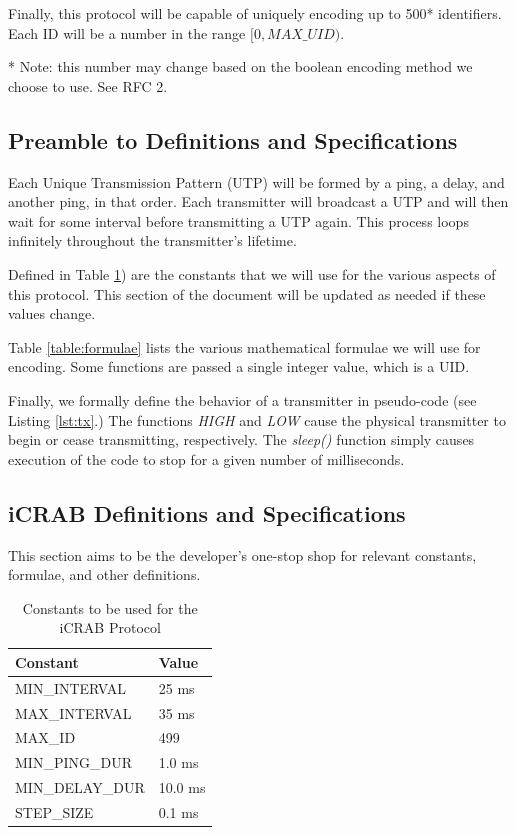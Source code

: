 \documentclass[12pt]{article}
\begin{document}
Finally, this protocol will be capable of uniquely encoding up to 500*
identifiers.
Each ID will be a number in the range $[0, MAX\_UID)$.

* Note: this number may change based on the boolean encoding method we choose
to use. See RFC 2.

\subsection{Preamble to Definitions and Specifications} \label{preamble}

Each Unique Transmission Pattern (UTP) will be formed by a ping, a delay,
and another ping, in that order.
Each transmitter will broadcast a UTP and will then wait for some interval
before transmitting a UTP again.
This process loops infinitely throughout the transmitter's lifetime.

Defined in Table \ref{table:constants}) are the constants that we will use for
the various aspects of this protocol.
This section of the document will be updated as needed if these values
change.

Table \ref{table:formulae} lists the various mathematical formulae we will
use for encoding.
Some functions are passed a single integer value, which is a UID.

Finally, we formally define the behavior of a transmitter in pseudo-code
(see Listing \ref{lst:tx}.)
The functions {\em HIGH} and {\em LOW} cause the physical transmitter to begin
or cease transmitting, respectively.
The {\em sleep()} function simply causes execution of the code to stop for a
given number of milliseconds.

\newpage
\subsection{iCRAB Definitions and Specifications} \label{specs}

This section aims to be the developer's one-stop shop for relevant constants,
formulae, and other definitions.

\begin{table}[ht]
\centering
\begin{tabular}{|l|l|}
\hline
Constant & Value \\
\hline
MIN\_INTERVAL	&	25 ms	\\
MAX\_INTERVAL	&	35 ms	\\
MAX\_ID			&	499		\\
MIN\_PING\_DUR	&	1.0 ms	\\
MIN\_DELAY\_DUR	&	10.0 ms	\\
STEP\_SIZE		&	0.1	ms	\\
\hline
\end{tabular}
\caption{Constants to be used for the iCRAB Protocol}\label{table:constants}
\end{table}
\end{document}
